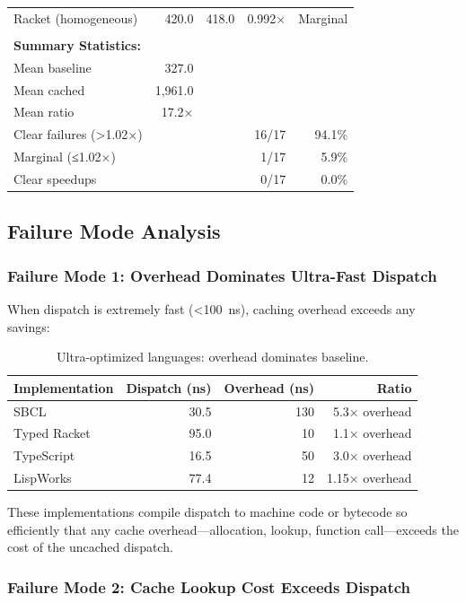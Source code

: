 \documentclass[sigplan,final]{acmart}
\begin{document}
\begin{table}[t!]
\begin{tabular}{@{}lrrrr@{}}
Racket (homogeneous) & 420.0 & 418.0 & 0.992× & Marginal \\
\\
\midrule
\textbf{Summary Statistics:} & & & & \\
Mean baseline & 327.0 & & & \\
Mean cached & 1,961.0 & & & \\
Mean ratio & 17.2× & & & \\
Clear failures (>1.02×) & & & 16/17 & 94.1\% \\
Marginal (≤1.02×) & & & 1/17 & 5.9\% \\
Clear speedups & & & 0/17 & 0.0\% \\
\bottomrule
\end{tabular}
\end{table}

\subsection{Failure Mode Analysis}

\subsubsection{Failure Mode 1: Overhead Dominates Ultra-Fast Dispatch}

When dispatch is extremely fast (<100~ns), caching overhead exceeds any savings:

\begin{table}[h]
\centering
\caption{Ultra-optimized languages: overhead dominates baseline.}
\label{tab:mode1}
\begin{tabular}{@{}lrrr@{}}
\toprule
\textbf{Implementation} & \textbf{Dispatch (ns)} & \textbf{Overhead (ns)} & \textbf{Ratio} \\
\midrule
SBCL & 30.5 & 130 & 5.3× overhead \\
Typed Racket & 95.0 & 10 & 1.1× overhead \\
TypeScript & 16.5 & 50 & 3.0× overhead \\
LispWorks & 77.4 & 12 & 1.15× overhead \\
\bottomrule
\end{tabular}
\end{table}

These implementations compile dispatch to machine code or bytecode so efficiently that any
cache overhead—allocation, lookup, function call—exceeds the cost of the uncached dispatch.

\subsubsection{Failure Mode 2: Cache Lookup Cost Exceeds Dispatch}
\end{document}
